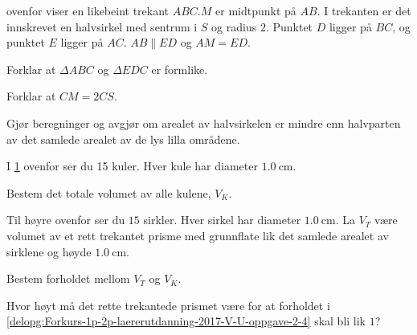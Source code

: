  ovenfor viser en
likebeint trekant $ABC$.$M$ er midtpunkt på $AB$. I trekanten er det innskrevet
en halvsirkel med sentrum i $S$ og radius $2$. Punktet $D$ ligger på $BC$, og
punktet $E$ ligger på $AC$. $AB\parallel ED$ og $AM=ED$.

\begin{oppgaver}
     Forklar at $\Delta ABC$ og $\Delta EDC$ er formlike.
\end{oppgaver}

\begin{oppgaver}
     Forklar at $CM = 2 CS$.
\end{oppgaver}

\begin{oppgaver}
     Gjør beregninger og avgjør om arealet av halvsirkelen er mindre enn
      halvparten av det samlede arealet av de lys lilla områdene.
\end{oppgaver}


\Oppgave[5]

\begin{figure}[H]
  \centering
  \caption{}
  \label{fig:Forkurs-1p-2p-laererutdanning-2017-V-U-oppgave-2-4}
\end{figure}

I \cref{fig:Forkurs-1p-2p-laererutdanning-2017-V-U-oppgave-2-4} ovenfor ser du
15 kuler. Hver kule har diameter $\SI{1.0}{\cm}$.

\begin{oppgaver}
  \Item{} Bestem det totale volumet av alle kulene, $V_K$.
\end{oppgaver}

Til høyre ovenfor ser du $15$ sirkler. Hver sirkel har diameter $\SI{1.0}{\cm}$.
La $V_T$ være volumet av et rett trekantet prisme med grunnflate lik det samlede
arealet av sirklene og høyde $\SI{1.0}{\cm}$.

\begin{oppgaver}
  \Item{} Bestem forholdet mellom $V_T$ og $V_K$.
    \label{delopg:Forkurs-1p-2p-laererutdanning-2017-V-U-oppgave-2-4}
\end{oppgaver}

\begin{oppgaver}
  \Item{} Hvor høyt må det rette trekantede prismet være for at forholdet i
    \cref{delopg:Forkurs-1p-2p-laererutdanning-2017-V-U-oppgave-2-4} skal bli
    lik $1$?
\end{oppgaver}

